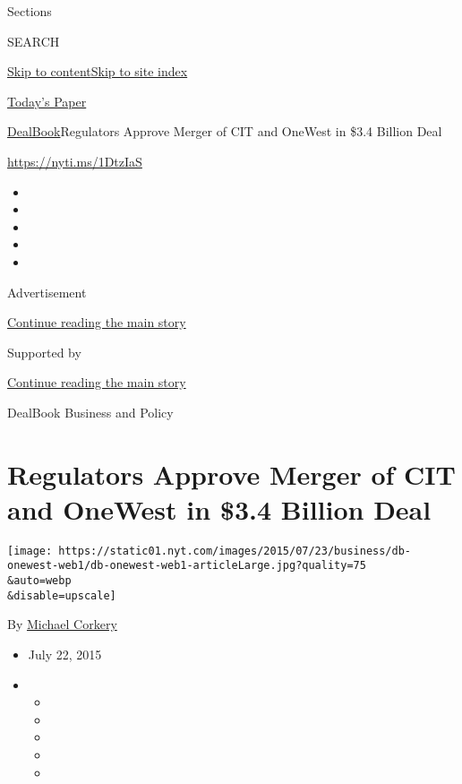 Sections

SEARCH

\protect\hyperlink{site-content}{Skip to
content}\protect\hyperlink{site-index}{Skip to site index}

\href{https://myaccount.nytimes.com/auth/login?response_type=cookie\&client_id=vi}{}

\href{https://www.nytimes.com/section/todayspaper}{Today's Paper}

\href{/section/business/dealbook}{DealBook}\textbar{}Regulators Approve
Merger of CIT and OneWest in \$3.4 Billion Deal

\url{https://nyti.ms/1DtzIaS}

\begin{itemize}
\item
\item
\item
\item
\item
\end{itemize}

Advertisement

\protect\hyperlink{after-top}{Continue reading the main story}

Supported by

\protect\hyperlink{after-sponsor}{Continue reading the main story}

DealBook Business and Policy

\hypertarget{regulators-approve-merger-of-cit-and-onewest-in-34-billion-deal}{%
\section{Regulators Approve Merger of CIT and OneWest in \$3.4 Billion
Deal}\label{regulators-approve-merger-of-cit-and-onewest-in-34-billion-deal}}

\texttt{[image: https://static01.nyt.com/images/2015/07/23/business/db-onewest-web1/db-onewest-web1-articleLarge.jpg?quality=75\\\&auto=webp\\\&disable=upscale]}

By \href{http://www.nytimes.com/by/michael-corkery}{Michael Corkery}

\begin{itemize}
\item
  July 22, 2015
\item
  \begin{itemize}
  \item
  \item
  \item
  \item
  \item
  \end{itemize}
\end{itemize}

